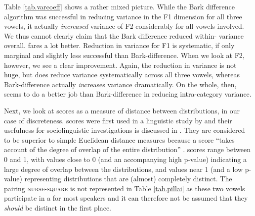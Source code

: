 Table \ref{tab.varcoeff} shows a rather mixed picture. While the Bark difference algorithm was successful in reducing variance in the F1 dimension for all three vowels, it actually \emph{increased} variance of F2 considerably for all vowels involved. We thus cannot clearly claim that the Bark difference  reduced within- variance overall.
\citeauthor{wattfabricius2002} fares a lot better.
Reduction in variance for F1 is systematic, if only marginal and slightly less successful than Bark-difference.
When we look at F2, however, we see a clear improvement.
Again, the reduction in variance is not huge, but \citeauthor{wattfabricius2002} does reduce variance systematically across all three vowels, whereas Bark-difference actually \emph{in}creases variance dramatically.
On the whole, then, \citeauthor{wattfabricius2002} seems to do a better job than Bark-difference in reducing intra-category variance.

Next, we look at  scores as a measure of distance between distributions, in our case of  discreteness.
 scores were first used in a linguistic study by \textcite{hayetal2006b} and their usefulness for sociolinguistic investigations is discussed in \citealt{halllew2010}.
They are considered to be superior to simple Euclidean distance measures because a  score ``takes account of the degree of overlap of the entire distribution'' \parencite[467]{hayetal2006b}.
 scores range between 0 and 1, with values close to 0 (and an accompanying high p-value) indicating a large degree of overlap between the distributions, and values near 1 (and a low p-value) representing distributions that are (almost) completely distinct.
The pairing \textsc{nurse-square} is not represented in Table \ref{tab.pillai} as these two vowels participate in a  for most speakers and it can therefore not be assumed that they \emph{should} be distinct in the first place.

